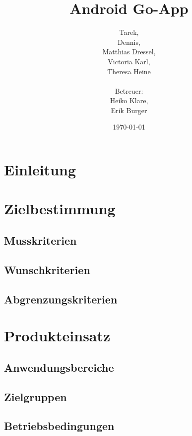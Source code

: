 \documentclass[parskip=full]{scrartcl}
\begin{document}
\title{Android Go-App}
\author{Tarek, \\Dennis, \\Matthias Dressel, \\Victoria Karl, \\Theresa Heine\\
	\\Betreuer: \\Heiko Klare, \\ Erik Burger\\}
\date{\today}
\maketitle
\newpage
\tableofcontents
\newpage

\section{Einleitung}

\section{Zielbestimmung}
\subsection{Musskriterien}

\subsection{Wunschkriterien}
\subsection{Abgrenzungskriterien}

\section{Produkteinsatz}
\subsection{Anwendungsbereiche}
\subsection{Zielgruppen}
\subsection{Betriebsbedingungen}
\end{document}
